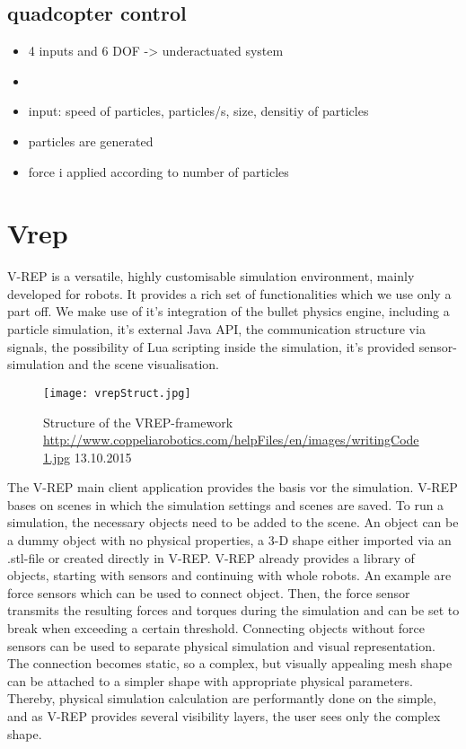 \subsection{quadcopter control}


\begin{itemize}
\item{4 inputs and 6 DOF -> underactuated system}
\item{}
\end{itemize}


\begin{itemize}
\item{input: speed of particles, particles/s, size, densitiy of particles}
\item{particles are generated}
\item{force i applied according to number of particles}
\end{itemize}


\section{Vrep}
\label{sec:theoryVrep}
V-REP is a versatile, highly customisable simulation environment, mainly developed for robots. It provides a rich set of functionalities which we use only a part off.  We make use of it's integration of the bullet physics engine, including a particle simulation, it's external Java API, the communication structure via signals, the possibility of Lua scripting inside the simulation, it's provided sensor-simulation and the scene visualisation.
\begin{figure}[h!]
 \begin{center}
  \texttt{[image: vrepStruct.jpg]}
 \end{center}
  \caption{Structure of the VREP-framework \url{http://www.coppeliarobotics.com/helpFiles/en/images/writingCode1.jpg} 13.10.2015 \label{fig:vrepStruct}}
\end{figure}

The V-REP main client application provides the basis vor the simulation. V-REP bases on scenes in which the simulation settings and scenes are saved. To run a simulation, the necessary objects need to be added to the scene. An object can be a dummy object with no physical properties, a 3-D shape either imported via an .stl-file or created directly in V-REP. V-REP already provides a library of objects, starting with sensors and continuing with whole robots. An example are force sensors which can be used to connect object. Then, the force sensor transmits the resulting forces and torques during the simulation and can be set to break when exceeding a certain threshold. Connecting objects without force sensors can be used to separate physical simulation and visual representation. The connection becomes static, so a complex, but visually appealing mesh shape can be attached to a simpler shape with appropriate physical parameters. Thereby, physical simulation calculation are performantly done on the simple, and as V-REP provides several visibility layers, the user sees only the complex shape.

